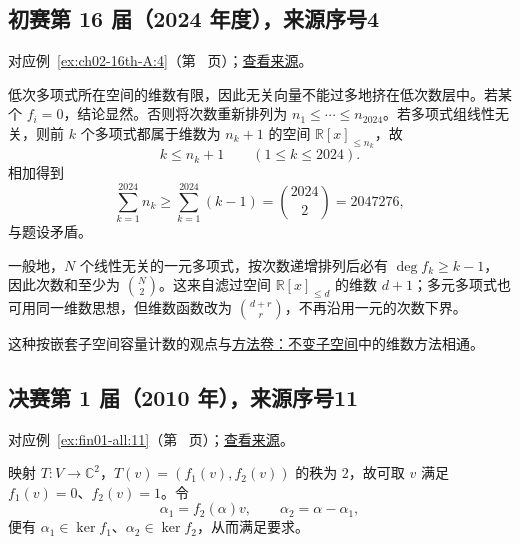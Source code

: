 \documentclass[UTF8,12pt,a4paper,fontset=fandol]{ctexart}
\begin{document}
\subsection{初赛第 16 届（2024 年度），来源序号4}\label{ans:ch02-16th-A:4}\label{pr:ch02-16th-A:4}

对应例~\ref{ex:ch02-16th-A:4}（第~\pageref{ex:ch02-16th-A:4} 页）；\href{https://github.com/lzxcr/cmc-mathematics/blob/64916fa1fdbc3e444a652eca204d5669058ee321/src/problems/preliminary/16/04.md}{查看来源}。

\begin{solve}

低次多项式所在空间的维数有限，因此无关向量不能过多地挤在低次数层中。若某个 $f_i=0$，结论显然。否则将次数重新排列为 $n_1\leq\cdots\leq n_{2024}$。若多项式组线性无关，则前 $k$ 个多项式都属于维数为 $n_k+1$ 的空间 $\mathbb R[x]_{\leq n_k}$，故
\[
k\leq n_k+1\qquad(1\leq k\leq2024).
\]
相加得到
\[
\sum_{k=1}^{2024}n_k\geq\sum_{k=1}^{2024}(k-1)
=\binom{2024}{2}=2047276,
\]
与题设矛盾。

\end{solve}

\begin{remark}[方法与条件]

一般地，$N$ 个线性无关的一元多项式，按次数递增排列后必有 $\deg f_k\geq k-1$，因此次数和至少为 $\binom N2$。这来自滤过空间 $\mathbb R[x]_{\leq d}$ 的维数 $d+1$；多元多项式也可用同一维数思想，但维数函数改为 $\binom{d+r}{r}$，不再沿用一元的次数下界。

这种按嵌套子空间容量计数的观点与\hyperref[app:linear-invariant]{方法卷：不变子空间}中的维数方法相通。

\end{remark}

\subsection{决赛第 1 届（2010 年），来源序号11}\label{ans:fin01-all:11}\label{pr:fin01-all:11}

对应例~\ref{ex:fin01-all:11}（第~\pageref{ex:fin01-all:11} 页）；\href{https://github.com/lzxcr/cmc-mathematics/blob/64916fa1fdbc3e444a652eca204d5669058ee321/src/problems/finals/01/11.md}{查看来源}。

\begin{solve}

映射 $T:V\to\mathbb C^2$，$T(v)=(f_1(v),f_2(v))$ 的秩为 $2$，故可取 $v$ 满足 $f_1(v)=0$、$f_2(v)=1$。令
\[
\alpha_1=f_2(\alpha)v,\qquad \alpha_2=\alpha-\alpha_1,
\]
便有 $\alpha_1\in\ker f_1$、$\alpha_2\in\ker f_2$，从而满足要求。

\end{solve}
\end{document}
